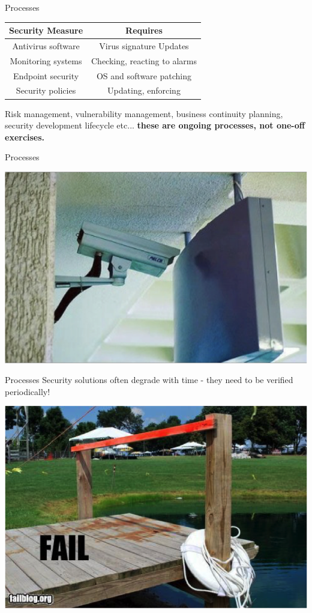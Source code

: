 \documentclass{beamer}
\begin{document}
\begin{frame}{Processes}
\begin{center}
\begin{tabular}{ |c|c| }
\hline
 \textbf{Security Measure} & \textbf{Requires}\\
\hline \hline
 Antivirus software & Virus signature Updates \\ \hline
 Monitoring systems & Checking, reacting to alarms \\  \hline
 Endpoint security & OS and software patching \\ \hline
 Security policies & Updating, enforcing \\
\hline
\end{tabular}
\end{center}
Risk management, vulnerability management, business continuity planning, security  development lifecycle etc... \textbf{these are ongoing processes, not one-off exercises.}
\end{frame}

\begin{frame}{Processes}
\begin{center}
\includegraphics[width=0.8\linewidth]{process1.png} 
\end{center}
\end{frame}

\begin{frame}{Processes}
Security solutions often degrade with time - they need to be verified periodically!
\begin{center}
\includegraphics[width=0.7\linewidth]{process2.png} 
\end{center}
\end{frame}
\end{document}
